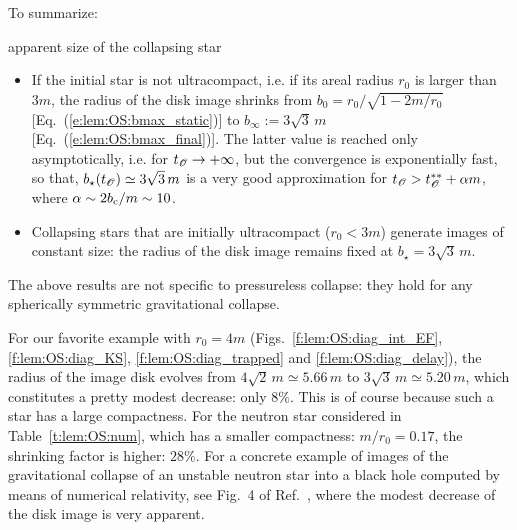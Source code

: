 To summarize:

\begin{tprop}{apparent size of the collapsing star}{}
\begin{itemize}
\item If the initial star is not ultracompact, i.e. if its areal radius
$r_0$ is larger than $3 m$,
the radius of the disk image shrinks from $b_0 = r_0 / \sqrt{1 - 2m/r_0}$
[Eq.~(\ref{e:lem:OS:bmax_static})]
to $b_\infty := 3\sqrt{3} \, m$ [Eq.~(\ref{e:lem:OS:bmax_final})].
The latter value is reached only asymptotically, i.e. for $t_{\mathscr{O}}\to +\infty$,
but the convergence is exponentially fast, so that, $b_\star(t_{\mathscr{O}}) \simeq 3\sqrt{3} \, m$
is a very good approximation for $t_{\mathscr{O}} > t_{\mathscr{O}}^{**} + \alpha m$, where $\alpha \sim 2 b_{\rm c}/m
\sim 10 $.
\item Collapsing stars that are initially ultracompact
($r_0 < 3 m$) generate images of constant size: the radius of the disk image
remains fixed at $b_\star = 3\sqrt{3} \, m$.
\end{itemize}
\end{tprop}

\begin{remark}
The above results are not specific to pressureless collapse: they
hold for any spherically symmetric gravitational collapse.
\end{remark}

\begin{texample}{}{}
For our favorite example with $r_0 = 4m$ (Figs.~\ref{f:lem:OS:diag_int_EF},
\ref{f:lem:OS:diag_KS}, \ref{f:lem:OS:diag_trapped} and \ref{f:lem:OS:diag_delay}),
the radius of the image disk evolves from $4\sqrt{2} \, m\simeq 5.66\, m$ to
$3\sqrt{3}\, m \simeq 5.20\, m$, which constitutes a pretty modest
decrease: only $8\%$. This is of course because such a star has a large compactness.
For the neutron star considered in Table~\ref{t:lem:OS:num}, which has a
smaller compactness: $m/r_0 = 0.17$, the shrinking factor is higher: $28\%$.
For a concrete example of images of the gravitational collapse of an unstable neutron star into a black hole computed by means of numerical relativity, see
Fig.~4 of Ref.~\cite{VinceGN12}, where the modest decrease of the disk image
is very apparent.
\end{texample}

